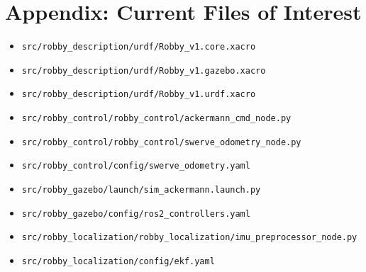 \documentclass[12pt,a4paper]{report}
\begin{document}
\chapter*{Appendix: Current Files of Interest}
\begin{itemize}[leftmargin=*]
  \item \texttt{src/robby\_description/urdf/Robby\_v1.core.xacro}
  \item \texttt{src/robby\_description/urdf/Robby\_v1.gazebo.xacro}
  \item \texttt{src/robby\_description/urdf/Robby\_v1.urdf.xacro}
  \item \texttt{src/robby\_control/robby\_control/ackermann\_cmd\_node.py}
  \item \texttt{src/robby\_control/robby\_control/swerve\_odometry\_node.py}
  \item \texttt{src/robby\_control/config/swerve\_odometry.yaml}
  \item \texttt{src/robby\_gazebo/launch/sim\_ackermann.launch.py}
  \item \texttt{src/robby\_gazebo/config/ros2\_controllers.yaml}
  \item \texttt{src/robby\_localization/robby\_localization/imu\_preprocessor\_node.py}
  \item \texttt{src/robby\_localization/config/ekf.yaml}
\end{itemize}
\end{document}
